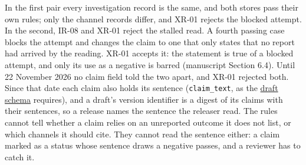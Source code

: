 \documentclass[
  11pt,
]{article}
\begin{document}
In the first pair every investigation record is the same, and both
stores pass their own rules; only the channel records differ, and
\mbox{XR-01} rejects the blocked attempt. In the second, \mbox{IR-08}
and \mbox{XR-01} reject the stalled read. A fourth passing case blocks
the attempt and changes the claim to one that only states that no report
had arrived by the reading. \mbox{XR-01} accepts it: the statement is
true of a blocked attempt, and only its use as a negative is barred
(manuscript Section 6.4). Until 22 November 2026 no claim field told the
two apart, and \mbox{XR-01} rejected both. Since that date each claim
also holds its sentence (\texttt{claim\_text}, as the
\href{SUPPLEMENT/S4_DRAFT_SCHEMA.csv}{draft schema} requires), and a
draft's version identifier is a digest of its claims with their
sentences, so a release names the sentence the releaser read. The rules
cannot tell whether a claim relies on an unreported outcome it does not
list, or which channels it should cite. They cannot read the sentence
either: a claim marked as a status whose sentence draws a negative
passes, and a reviewer has to catch it.
\end{document}
